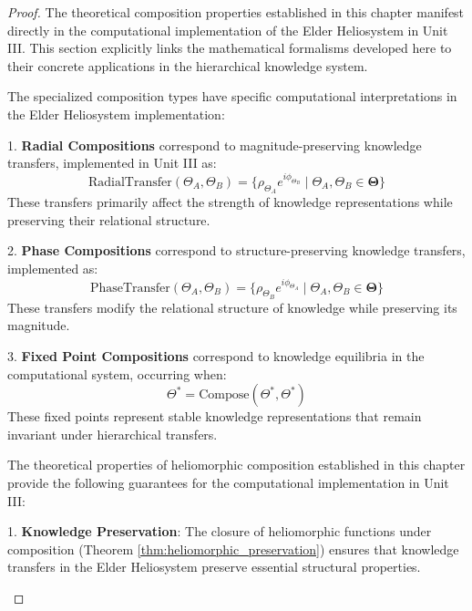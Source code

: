 \begin{definition}
\begin{enumerate}
\begin{definition}
\begin{proof}
The theoretical composition properties established in this chapter manifest directly in the computational implementation of the Elder Heliosystem in Unit III. This section explicitly links the mathematical formalisms developed here to their concrete applications in the hierarchical knowledge system.

\begin{theorem}
\label{thm:specialized_compositions_implementation}
The specialized composition types have specific computational interpretations in the Elder Heliosystem implementation:

1. \textbf{Radial Compositions} correspond to magnitude-preserving knowledge transfers, implemented in Unit III as:
\begin{equation}
\text{RadialTransfer}(\Theta_A, \Theta_B) = \{\rho_{\Theta_A} e^{i\phi_{\Theta_B}} \mid \Theta_A, \Theta_B \in \boldsymbol{\Theta}\}
\end{equation}
These transfers primarily affect the strength of knowledge representations while preserving their relational structure.

2. \textbf{Phase Compositions} correspond to structure-preserving knowledge transfers, implemented as:
\begin{equation}
\text{PhaseTransfer}(\Theta_A, \Theta_B) = \{\rho_{\Theta_B} e^{i\phi_{\Theta_A}} \mid \Theta_A, \Theta_B \in \boldsymbol{\Theta}\}
\end{equation}
These transfers modify the relational structure of knowledge while preserving its magnitude.

3. \textbf{Fixed Point Compositions} correspond to knowledge equilibria in the computational system, occurring when:
\begin{equation}
\Theta^* = \text{Compose}(\Theta^*, \Theta^*)
\end{equation}
These fixed points represent stable knowledge representations that remain invariant under hierarchical transfers.
\end{theorem}

\begin{corollary}
\label{cor:computational_guarantees}
The theoretical properties of heliomorphic composition established in this chapter provide the following guarantees for the computational implementation in Unit III:

1. \textbf{Knowledge Preservation}: The closure of heliomorphic functions under composition (Theorem \ref{thm:heliomorphic_preservation}) ensures that knowledge transfers in the Elder Heliosystem preserve essential structural properties.


\end{corollary}
\end{proof}
\end{definition}
\end{enumerate}
\end{definition}
